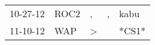 \begin{supertabular}{lllll}
 10-27-12 &  ROC2 &             , &  , &   kabu \\
 11-10-12 &   WAP &  \textgreater &    &  *CS1* \\
\end{supertabular}
